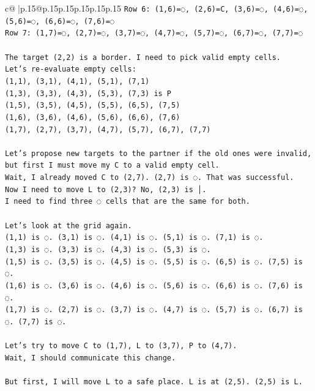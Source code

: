 \documentclass{article}
\begin{document}
{\begin{supertabular}{c@{$\;$}|p{.15\linewidth}@{}p{.15\linewidth}p{.15\linewidth}p{.15\linewidth}p{.15\linewidth}p{.15\linewidth}}
{{{\texttt{Row 6: (1,6)=◌, (2,6)=C, (3,6)=◌, (4,6)=◌, (5,6)=◌, (6,6)=◌, (7,6)=◌} \\
\texttt{Row 7: (1,7)=◌, (2,7)=◌, (3,7)=◌, (4,7)=◌, (5,7)=◌, (6,7)=◌, (7,7)=◌} \\
\\ 
\texttt{The target (2,2) is a border. I need to pick valid empty cells.} \\
\texttt{Let's re{-}evaluate empty cells:} \\
\texttt{(1,1), (3,1), (4,1), (5,1), (7,1)} \\
\texttt{(1,3), (3,3), (4,3), (5,3), (7,3) is P} \\
\texttt{(1,5), (3,5), (4,5), (5,5), (6,5), (7,5)} \\
\texttt{(1,6), (3,6), (4,6), (5,6), (6,6), (7,6)} \\
\texttt{(1,7), (2,7), (3,7), (4,7), (5,7), (6,7), (7,7)} \\
\\ 
\texttt{Let's propose new targets to the partner if the old ones were invalid, but first I must move my C to a valid empty cell.} \\
\texttt{Wait, I already moved C to (2,7). (2,7) is ◌. That was successful.} \\
\texttt{Now I need to move L to (2,3)? No, (2,3) is │.} \\
\texttt{I need to find three ◌ cells that are the same for both.} \\
\\ 
\texttt{Let's look at the grid again.} \\
\texttt{(1,1) is ◌. (3,1) is ◌. (4,1) is ◌. (5,1) is ◌. (7,1) is ◌.} \\
\texttt{(1,3) is ◌. (3,3) is ◌. (4,3) is ◌. (5,3) is ◌.} \\
\texttt{(1,5) is ◌. (3,5) is ◌. (4,5) is ◌. (5,5) is ◌. (6,5) is ◌. (7,5) is ◌.} \\
\texttt{(1,6) is ◌. (3,6) is ◌. (4,6) is ◌. (5,6) is ◌. (6,6) is ◌. (7,6) is ◌.} \\
\texttt{(1,7) is ◌. (2,7) is ◌. (3,7) is ◌. (4,7) is ◌. (5,7) is ◌. (6,7) is ◌. (7,7) is ◌.} \\
\\ 
\texttt{Let's try to move C to (1,7), L to (3,7), P to (4,7).} \\
\texttt{Wait, I should communicate this change.} \\
\\ 
\texttt{But first, I will move L to a safe place. L is at (2,5). (2,5) is L.} \\
}}}
\end{supertabular}}
\end{document}
